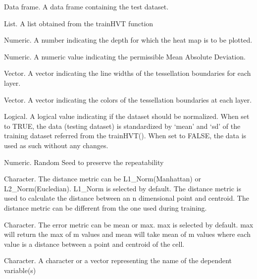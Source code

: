 \documentclass[letterpaper]{book}
\begin{document}
\begin{Arguments}
\begin{ldescription}
\item[\code{data}] Data frame. A data frame containing the test dataset.

\item[\code{hvt.results.model}] List. A list obtained from the trainHVT function

\item[\code{child.level}] Numeric. A number indicating the depth for which the heat map is to be plotted.

\item[\code{mad.threshold}] Numeric. A numeric value indicating the permissible Mean Absolute Deviation.

\item[\code{line.width}] Vector. A vector indicating the line widths of the tessellation boundaries for each layer.

\item[\code{color.vec}] Vector. A vector indicating the colors of the tessellation boundaries at each layer.

\item[\code{normalize}] Logical. A logical value indicating if the dataset should be normalized. When set to TRUE,
the data (testing dataset) is standardized by ‘mean’ and ‘sd’ of the training dataset referred from the trainHVT(). 
When set to FALSE, the data is used as such without any changes.

\item[\code{seed}] Numeric. Random Seed to preserve the repeatability

\item[\code{distance\_metric}] Character. The distance metric can be L1\_Norm(Manhattan) or L2\_Norm(Eucledian). L1\_Norm is selected by default.
The distance metric is used to calculate the distance between an n dimensional point and centroid.
The distance metric can be different from the one used during training.

\item[\code{error\_metric}] Character. The error metric can be mean or max. max is selected by default. 
max will return the max of m values and mean will take mean of m values where
each value is a distance between a point and centroid of the cell.

\item[\code{yVar}] Character. A character or a vector representing the name of the dependent variable(s)
\end{ldescription}
\end{Arguments}
\end{document}
